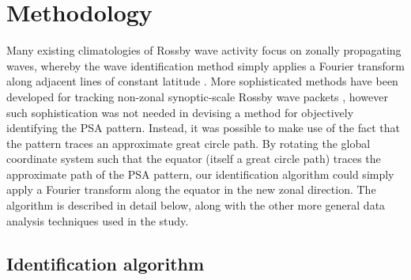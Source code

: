 \section{Methodology}

Many existing climatologies of Rossby wave activity focus on zonally propagating waves, whereby the wave identification method simply applies a Fourier transform along adjacent lines of constant latitude \citep[e.g.][]{Glatt2014,IrvingSimmonds2015}. More sophisticated methods have been developed for tracking non-zonal synoptic-scale Rossby wave packets \citep[e.g.][]{Zimin2006,Souders2014}, however such sophistication was not needed in devising a method for objectively identifying the PSA pattern. Instead, it was possible to make use of the fact that the pattern traces an approximate great circle path. By rotating the global coordinate system such that the equator (itself a great circle path) traces the approximate path of the PSA pattern, our identification algorithm could simply apply a Fourier transform along the equator in the new zonal direction. The algorithm is described in detail below, along with the other more general data analysis techniques used in the study.

\subsection{Identification algorithm}
